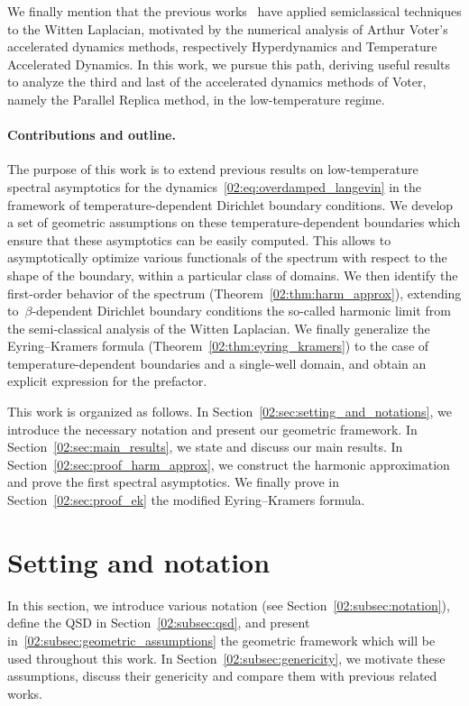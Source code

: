     We finally mention that the previous works~\cite{LN15,DGLLPN19} have applied semiclassical techniques to the Witten Laplacian, motivated by the numerical analysis of Arthur Voter's accelerated dynamics methods, respectively Hyperdynamics and Temperature Accelerated Dynamics. In this work, we pursue this path, deriving useful results to analyze the third and last of the accelerated dynamics methods of Voter, namely the Parallel Replica method, in the low-temperature regime.

    \paragraph{Contributions and outline.}
    The purpose of this work is to extend previous results on low-temperature spectral asymptotics for the dynamics~\eqref{02:eq:overdamped_langevin} in the framework of temperature-dependent Dirichlet boundary conditions.
    We develop a set of geometric assumptions on these temperature-dependent boundaries which ensure that these asymptotics can be easily computed. This allows to asymptotically optimize various functionals of the spectrum with respect to the shape of the boundary, within a particular class of domains.
    We then identify the first-order behavior of the spectrum (Theorem~\ref{02:thm:harm_approx}), extending to~$\beta$-dependent Dirichlet boundary conditions the so-called harmonic limit from the semi-classical analysis of the Witten Laplacian.
    We finally generalize the Eyring--Kramers formula (Theorem~\ref{02:thm:eyring_kramers}) to the case of temperature-dependent boundaries and a single-well domain, and obtain an explicit expression for the prefactor.


    This work is organized as follows. In Section~\ref{02:sec:setting_and_notations}, we introduce the necessary notation and present our geometric framework. In Section~\ref{02:sec:main_results}, we state and discuss our main results. In Section~\ref{02:sec:proof_harm_approx}, we construct the harmonic approximation and prove the first spectral asymptotics. We finally prove in Section~\ref{02:sec:proof_ek} the modified Eyring--Kramers formula.
    \section{Setting and notation}
    In this section, we introduce various notation (see Section~\ref{02:subsec:notation}), define the QSD in Section~\ref{02:subsec:qsd}, and present in~\ref{02:subsec:geometric_assumptions} the geometric framework which will be used throughout this work.
    In Section~\ref{02:subsec:genericity}, we motivate these assumptions, discuss their genericity and compare them with previous related works. 
    \label{02:sec:setting_and_notations}
